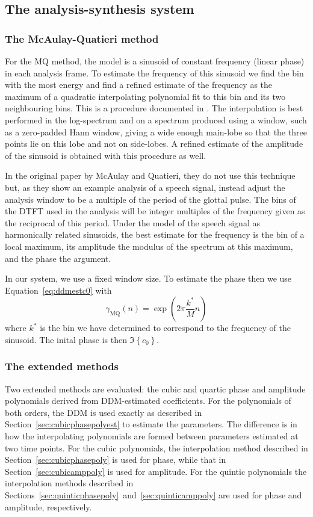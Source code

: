 \subsection{The analysis-synthesis system}

\subsubsection{The McAulay-Quatieri method}

For the MQ method, the model is a sinusoid of constant frequency (linear phase)
in each analysis frame. To estimate the frequency of this sinusoid we find the
bin with the most energy and find a refined estimate of the frequency as the
maximum of a quadratic interpolating polynomial fit to this bin and its two
neighbouring bins. This is a procedure documented in
\cite[p.~45]{serra1989system}. The interpolation is best performed in the
log-spectrum and on a spectrum produced using a window, such as a zero-padded
Hann window, giving a wide enough main-lobe so that the three points lie on this
lobe and not on side-lobes. A refined estimate of the amplitude of the sinusoid
is obtained with this procedure as well.

In the original paper by McAulay and Quatieri, they do not use this technique
but, as they show an example analysis of a speech signal, instead adjust the
analysis window to be a multiple of the period of the glottal pulse. The bins of
the DTFT used in the analysis will be integer multiples of the frequency given
as the reciprocal of this period. Under the model of the speech signal as
harmonically related sinusoids, the best estimate for the frequency is the bin
of a local maximum, its amplitude the modulus of the spectrum at this maximum, and
the phase the argument.

In our system, we use a fixed window size. To estimate the phase then we use
Equation~\ref{eq:ddmestc0} with
\[
    \gamma_{\text{MQ}}(n)=\exp(2\pi\frac{k^{\ast}}{M}n)
\]
where $k^{\ast}$ is the bin we have determined to correspond to the frequency of
the sinusoid. The inital phase is then $\Im \left\{ c_{0} \right\}$.

\subsubsection{The extended methods}

Two extended methods are evaluated: the cubic and quartic phase and amplitude polynomials
derived from DDM-estimated coefficients. For the polynomials of both orders, the
DDM is used exactly as described in Section~\ref{sec:cubicphasepolyest} to estimate
the parameters. The difference is in how the interpolating polynomials are
formed between parameters estimated at two time points. For the cubic
polynomials, the interpolation method described in
Section~\ref{sec:cubicphasepoly} is used for phase, while that in
Section~\ref{sec:cubicamppoly} is used for amplitude. For the quintic
polynomials the interpolation methods described in
Sections~\ref{sec:quinticphasepoly}~and~\ref{sec:quinticamppoly} are used for
phase and amplitude, respectively.

